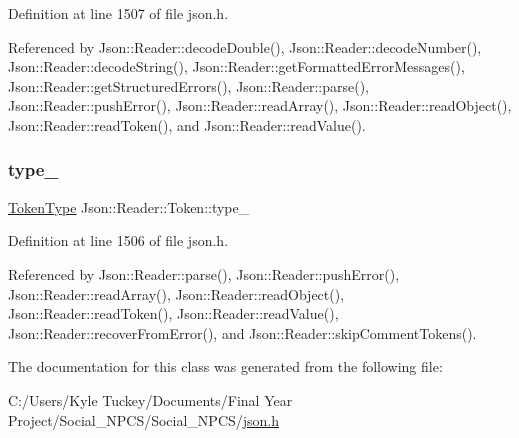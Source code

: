 Definition at line 1507 of file json.\+h.



Referenced by Json\+::\+Reader\+::decode\+Double(), Json\+::\+Reader\+::decode\+Number(), Json\+::\+Reader\+::decode\+String(), Json\+::\+Reader\+::get\+Formatted\+Error\+Messages(), Json\+::\+Reader\+::get\+Structured\+Errors(), Json\+::\+Reader\+::parse(), Json\+::\+Reader\+::push\+Error(), Json\+::\+Reader\+::read\+Array(), Json\+::\+Reader\+::read\+Object(), Json\+::\+Reader\+::read\+Token(), and Json\+::\+Reader\+::read\+Value().

\mbox{\label{class_json_1_1_reader_1_1_token_aa0f06d0105ec3d8cb42427c66b991bad}} 
\subsubsection{\texorpdfstring{type\+\_\+}{type\_}}
{\footnotesize\ttfamily \hyperlink{class_json_1_1_reader_aa35e6ab574dc399a0a645ad98ed66bc9}{Token\+Type} Json\+::\+Reader\+::\+Token\+::type\+\_\+}



Definition at line 1506 of file json.\+h.



Referenced by Json\+::\+Reader\+::parse(), Json\+::\+Reader\+::push\+Error(), Json\+::\+Reader\+::read\+Array(), Json\+::\+Reader\+::read\+Object(), Json\+::\+Reader\+::read\+Token(), Json\+::\+Reader\+::read\+Value(), Json\+::\+Reader\+::recover\+From\+Error(), and Json\+::\+Reader\+::skip\+Comment\+Tokens().



The documentation for this class was generated from the following file\+:\begin{DoxyCompactItemize}
\item 
C\+:/\+Users/\+Kyle Tuckey/\+Documents/\+Final Year Project/\+Social\+\_\+\+N\+P\+C\+S/\+Social\+\_\+\+N\+P\+C\+S/\hyperlink{json_8h}{json.\+h}\end{DoxyCompactItemize}

